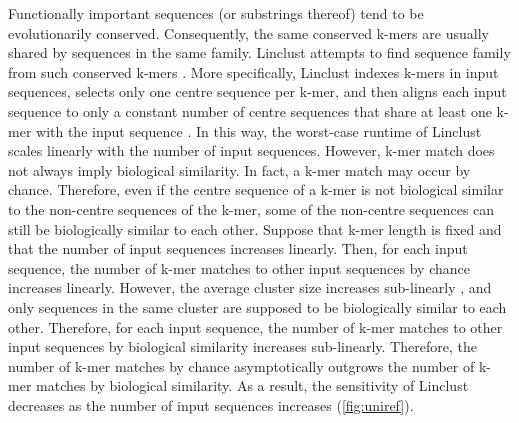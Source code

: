 \documentclass[11pt,letterpaper]{article}
\begin{document}
Functionally important sequences (or substrings thereof) tend to be evolutionarily conserved.
Consequently, the same conserved k-mers are usually shared by sequences in the same family.
Linclust attempts to find sequence family from such conserved k-mers \citep{steinegger2017linclust}.
More specifically, 
	Linclust indexes k-mers in input sequences, 
	selects only one centre sequence per k-mer,
	and then aligns each input sequence to only a constant number of centre sequences that share at least one k-mer with the input sequence \citep{steinegger2017linclust}.
In this way, the worst-case runtime of Linclust scales linearly with the number of input sequences.
However, k-mer match does not always imply biological similarity.
In fact, a k-mer match may occur by chance.
Therefore,
	even if the centre sequence of a k-mer is not biological similar to the non-centre sequences of the k-mer, 
	some of the non-centre sequences can still be biologically similar to each other.
Suppose that k-mer length is fixed and that the number of input sequences increases linearly.
Then, for each input sequence,
	the number of k-mer matches to other input sequences by chance increases linearly.
However,
	the average cluster size increases sub-linearly \citep[Fig. 3]{suzek2014uniref},
	and only sequences in the same cluster are supposed to be biologically similar to each other.
Therefore,
	for each input sequence,
	the number of k-mer matches to other input sequences by biological similarity increases sub-linearly.
Therefore, the number of k-mer matches by chance asymptotically outgrows the number of k-mer matches by biological similarity.
As a result, the sensitivity of Linclust decreases as the number of input sequences increases (\cref{fig:uniref}).


\end{document}
